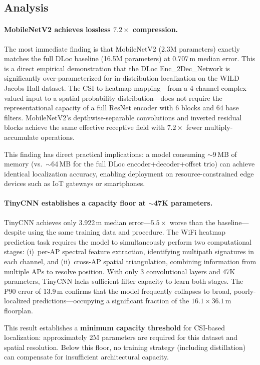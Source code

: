 \documentclass[11pt,a4paper]{article}
\begin{document}
\subsection{Analysis}

\paragraph{MobileNetV2 achieves lossless $7.2\times$ compression.}
The most immediate finding is that MobileNetV2 (2.3M parameters) exactly matches the full DLoc baseline (16.5M parameters) at 0.707\,m median error.
This is a direct empirical demonstration that the DLoc Enc\_2Dec\_Network is significantly over-parameterized for in-distribution localization on the WILD Jacobs Hall dataset.
The CSI-to-heatmap mapping---from a 4-channel complex-valued input to a spatial probability distribution---does not require the representational capacity of a full ResNet encoder with 6 blocks and 64 base filters.
MobileNetV2's depthwise-separable convolutions and inverted residual blocks achieve the same effective receptive field with $7.2\times$ fewer multiply-accumulate operations.

This finding has direct practical implications: a model consuming $\sim$9\,MB of memory (vs.\ $\sim$64\,MB for the full DLoc encoder+decoder+offset trio) can achieve identical localization accuracy, enabling deployment on resource-constrained edge devices such as IoT gateways or smartphones.

\paragraph{TinyCNN establishes a capacity floor at $\sim$47K parameters.}
TinyCNN achieves only 3.922\,m median error---$5.5\times$ worse than the baseline---despite using the same training data and procedure.
The WiFi heatmap prediction task requires the model to simultaneously perform two computational stages: (i)~per-AP spectral feature extraction, identifying multipath signatures in each channel, and (ii)~cross-AP spatial triangulation, combining information from multiple APs to resolve position.
With only 3 convolutional layers and 47K parameters, TinyCNN lacks sufficient filter capacity to learn both stages.
The P90 error of 13.9\,m confirms that the model frequently collapses to broad, poorly-localized predictions---occupying a significant fraction of the $16.1 \times 36.1$\,m floorplan.

This result establishes a \textbf{minimum capacity threshold} for CSI-based localization: approximately 2M parameters are required for this dataset and spatial resolution.
Below this floor, no training strategy (including distillation) can compensate for insufficient architectural capacity.
\end{document}
